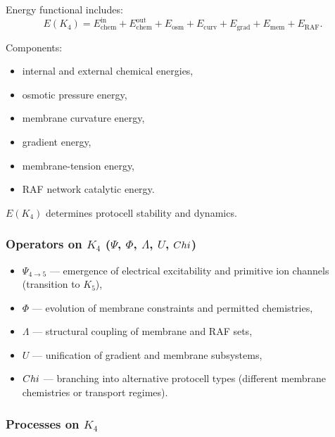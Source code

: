 Energy functional includes:
\[
E(K_4) =
E_{\mathrm{chem}}^{\mathrm{in}} + E_{\mathrm{chem}}^{\mathrm{out}}
+ E_{\mathrm{osm}} + E_{\mathrm{curv}}
+ E_{\mathrm{grad}} + E_{\mathrm{mem}}
+ E_{\mathrm{RAF}}.
\]

Components:
\begin{itemize}
    \item internal and external chemical energies,
    \item osmotic pressure energy,
    \item membrane curvature energy,
    \item gradient energy,
    \item membrane-tension energy,
    \item RAF network catalytic energy.
\end{itemize}

$E(K_4)$ determines protocell stability and dynamics.

\subsubsection{Operators on \texorpdfstring{$K_4$}{K_4} (\texorpdfstring{$\Psi$}{\Psi}, \texorpdfstring{$\Phi$}{\Phi}, \texorpdfstring{$\Lambda$}{\Lambda}, \texorpdfstring{$U$}{U}, \texorpdfstring{$Chi$}{\Chi})}

\begin{itemize}
    \item $\Psi_{4\to5}$ — emergence of electrical excitability and
          primitive ion channels (transition to $K_5$),
    \item $\Phi$ — evolution of membrane constraints and permitted
          chemistries,
    \item $\Lambda$ — structural coupling of membrane and RAF sets,
    \item $U$ — unification of gradient and membrane subsystems,
    \item $Chi$ — branching into alternative protocell types (different
          membrane chemistries or transport regimes).
\end{itemize}

\subsubsection{Processes on \texorpdfstring{$K_4$}{K_4}}

